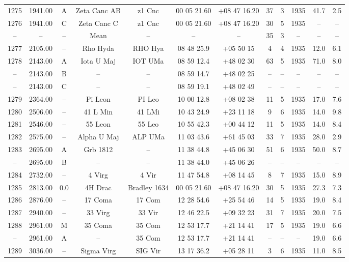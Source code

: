\begin{table}
\begin{tabular}{cccccccccccc}
1275 & 1941.00 & A & Zeta Canc AB & z1 Cnc & 00 05 21.60 & +08 47 16.20 & 37 & 3 & 1935 & 41.7 & 2.5 \\
1276 & 1941.00 & C & Zeta Canc C & z1 Cnc & 00 05 21.60 & +08 47 16.20 & 30 & 5 & 1935 & -- & -- \\
-- & -- & -- & Mean & -- & -- & -- & 35 & 3 & -- & -- & -- \\
1277 & 2105.00 & -- & Rho Hyda & RHO Hya & 08 48 25.9 & +05 50 15 & 4 & 4 & 1935 & 12.0 & 6.1 \\
1278 & 2143.00 & A & Iota U Maj & IOT UMa & 08 59 12.4 & +48 02 30 & 63 & 5 & 1935 & 71.0 & 8.0 \\
-- & 2143.00 & B & -- & -- & 08 59 14.7 & +48 02 25 & -- & -- & -- & -- & -- \\
-- & 2143.00 & C & -- & -- & 08 59 19.1 & +48 02 49 & -- & -- & -- & -- & -- \\
1279 & 2364.00 & -- & Pi Leon & PI Leo & 10 00 12.8 & +08 02 38 & 11 & 5 & 1935 & 17.0 & 7.6 \\
1280 & 2506.00 & -- & 41 L Min & 41 LMi & 10 43 24.9 & +23 11 18 & 9 & 6 & 1935 & 14.0 & 9.8 \\
1281 & 2546.00 & -- & 55 Leon & 55 Leo & 10 55 42.3 & +00 44 12 & 11 & 5 & 1935 & 14.0 & 8.4 \\
1282 & 2575.00 & -- & Alpha U Maj & ALP UMa & 11 03 43.6 & +61 45 03 & 33 & 7 & 1935 & 28.0 & 2.9 \\
1283 & 2695.00 & A & Grb 1812 & -- & 11 38 44.8 & +45 06 30 & 51 & 6 & 1935 & 50.0 & 8.7 \\
-- & 2695.00 & B & -- & -- & 11 38 44.0 & +45 06 26 & -- & -- & -- & -- & -- \\
1284 & 2732.00 & -- & 4 Virg & 4 Vir & 11 47 54.8 & +08 14 45 & 8 & 7 & 1935 & 15.0 & 8.9 \\
1285 & 2813.00 & 0.0 & 4H Drac & Bradley 1634 & 00 05 21.60 & +08 47 16.20 & 30 & 5 & 1935 & 27.3 & 7.3 \\
1286 & 2876.00 & -- & 17 Coma & 17 Com & 12 28 54.6 & +25 54 46 & 14 & 5 & 1935 & 19.0 & 8.4 \\
1287 & 2940.00 & -- & 33 Virg & 33 Vir & 12 46 22.5 & +09 32 23 & 31 & 7 & 1935 & 20.0 & 7.5 \\
1288 & 2961.00 & M & 35 Coma & 35 Com & 12 53 17.7 & +21 14 41 & 17 & 5 & 1935 & 19.0 & 6.6 \\
-- & 2961.00 & A & -- & 35 Com & 12 53 17.7 & +21 14 41 & -- & -- & -- & 19.0 & 6.6 \\
1289 & 3036.00 & -- & Sigma Virg & SIG Vir & 13 17 36.2 & +05 28 11 & 3 & 6 & 1935 & 11.0 & 8.5 \\

\end{tabular}
\end{table}
